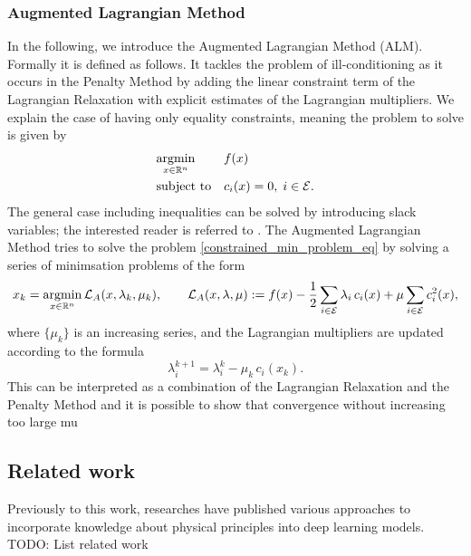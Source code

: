 \subsubsection{Augmented Lagrangian Method}
In the following, we introduce the Augmented Lagrangian Method (ALM). Formally it is defined as follows. It tackles the problem of ill-conditioning as it occurs in the Penalty Method by adding the linear constraint term of the Lagrangian Relaxation with explicit estimates of the Lagrangian multipliers. We explain the case of having only equality constraints, meaning the problem to solve is given by 
\begin{equation}
\label{constrained_min_problem_eq}
\begin{aligned}
& \underset{x \in \mathbb{R}^n}{\operatorname*{argmin}}
& & f(x) \\
& \text{subject to}
& & c_i(x) = 0, \; i \in \mathcal{E}.
\end{aligned}
\end{equation}
The general case including inequalities can be solved by introducing slack variables; the interested reader is referred to \cite{NoceWrig06}.
The Augmented Lagrangian Method tries to solve the problem \ref{constrained_min_problem_eq} by solving a series of minimsation problems of the form
\[x_k = \operatorname*{argmin}_{x \in \mathbb{R}^n} \mathcal{L}_A(x, \lambda_k, \mu_k), \qquad \mathcal{L}_A(x, \lambda, \mu) := f(x) - \frac{1}{2}\sum_{i \in \mathcal{E}} \lambda_i \,c_i(x) + \mu \sum_{i \in \mathcal{E}} c_i^2(x),\]
where $\{\mu_k\}$ is an increasing series, and the Lagrangian multipliers are updated according to the formula
\[ \lambda_i^{k+1} = \lambda_i^k - \mu_k\,c_i(x_k). \]
This can be interpreted as a combination of the Lagrangian Relaxation and the Penalty Method and it is possible to show that convergence without increasing too large mu


\subsection{Related work}
Previously to this work, researches have published various approaches to incorporate knowledge about physical principles into deep learning models. \\
TODO: List related work

\clearpage

